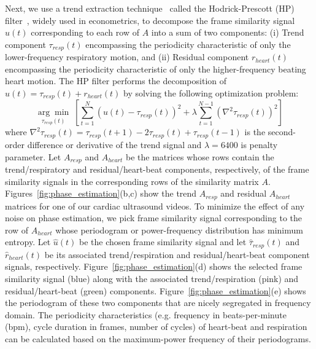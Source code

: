 \documentclass[runningheads,a4paper]{llncs}
\newcommand{\argmin}[1]{\underset{#1}{\operatorname{arg}\operatorname{min}}\;}
\begin{document}
	Next, we use a trend extraction technique~\cite{Alexandrov2012} called the Hodrick-Prescott (HP) filter~\cite{Yamada2015}, widely used in econometrics, to decompose the frame similarity signal $u(t)$ corresponding to each row of $A$ into a sum of two components: (i) Trend component $\tau_{resp}(t)$ encompassing the periodicity characteristic of only the lower-frequency respiratory motion, and (ii) Residual component $r_{heart}(t)$ encompassing the periodicity characteristic of only the higher-frequency beating heart motion. The HP filter performs the decomposition of $u(t) = \tau_{resp}(t) + r_{heart}(t)$ by solving the following optimization problem:
\begin{equation}	
\argmin{\tau_{resp}(t)} \left[ \sum_{t=1}^{N}  \left(u(t) - \tau_{resp}(t) \right)^2  + \lambda \sum_{t=1}^{N-1} \left( \nabla^2 \tau_{resp}(t) \right)^2 \right] 
\end{equation}
where $\nabla^2\tau_{resp}(t) = \tau_{resp}(t+1) - 2 \tau_{resp}(t) + \tau_{resp}(t-1)$ is the second-order difference or derivative of the trend signal and $\lambda=6400$ is penalty parameter. Let $A_{resp}$ and $A_{heart}$ be the matrices whose rows contain the trend/respiratory and residual/heart-beat components, respectively, of the frame similarity signals in the corresponding rows of the similarity matrix $A$. Figures~\ref{fig:phase_estimation}(b,c) show the trend $A_{resp}$ and residual $A_{heart}$ matrices for one of our cardiac ultrasound videos. To minimize the effect of any noise on phase estimation, we pick frame similarity signal corresponding to the row of $A_{heart}$ whose periodogram or power-frequency distribution has minimum entropy. Let $\hat{u}(t)$ be the chosen frame similarity signal and let $\hat{\tau}_{resp}(t)$ and $\hat{r}_{heart}(t)$  be its associated trend/respiration and residual/heart-beat component signals, respectively. Figure~\ref{fig:phase_estimation}(d) shows the selected frame similarity signal (blue) along with the associated trend/respiration (pink) and residual/heart-beat (green) components. Figure~\ref{fig:phase_estimation}(e) shows the periodogram of these two components that are nicely segregated in frequency domain. The periodicity characteristics (e.g. frequency in beats-per-minute (bpm), cycle duration in frames, number of cycles) of heart-beat and respiration can be calculated based on the maximum-power frequency of their periodograms.
\end{document}
